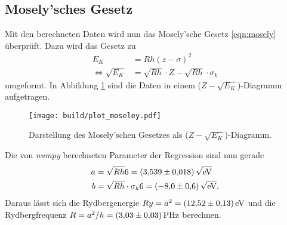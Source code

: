 

\subsection{Mosely'sches Gesetz}
\label{sec:Mosely}
Mit den berechneten Daten wird nun das Mosely'sche Gesetz \eqref{eqn:mosely} überprüft. Dazu wird das Gesetz zu
\begin{align*}
    E_K &= R h (z - \sigma)^2 \\
    \Leftrightarrow\sqrt{E_K} &= \sqrt{R h}\cdot Z - \sqrt{R h}\cdot\sigma_k
\end{align*}
umgeformt. In Abbildung \ref{fig:mosely} sind die Daten in einem ($Z-\sqrt{E_K}$)-Diagramm aufgetragen.
\begin{figure}
    \centering
    \texttt{[image: build/plot\_moseley.pdf]}
    \caption{Darstellung des Mosely'schen Gesetzes als ($Z-\sqrt{E_K}$)-Diagramm.}
    \label{fig:mosely}
\end{figure}
Die von \textit{numpy} \cite{numpy} berechneten Parameter der Regression sind nun gerade
\begin{align*}
    a&=\sqrt{R h}              6=\SI{3.539\pm 0.018}{\sqrt{\electronvolt}}\\
    b&=\sqrt{R h}\cdot\sigma_k 6=\SI{-8.0 \pm 0.6}{\sqrt{\electronvolt}}.
\end{align*}
Daraus lässt sich die Rydbergenergie $Ry=a^2=\SI{12.52\pm 0.13}{\electronvolt}$ und die Rydbergfrequenz $R=a^2/h=\SI{3.03\pm 0.03}{\peta\hertz}$
berechnen.
